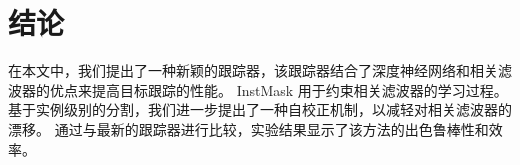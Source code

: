 \section{结论}
在本文中，我们提出了一种新颖的跟踪器，该跟踪器结合了深度神经网络和相关滤波器的优点来提高目标跟踪的性能。
InstMask 用于约束相关滤波器的学习过程。基于实例级别的分割，我们进一步提出了一种自校正机制，以减轻对相关滤波器的漂移。
通过与最新的跟踪器进行比较，实验结果显示了该方法的出色鲁棒性和效率。